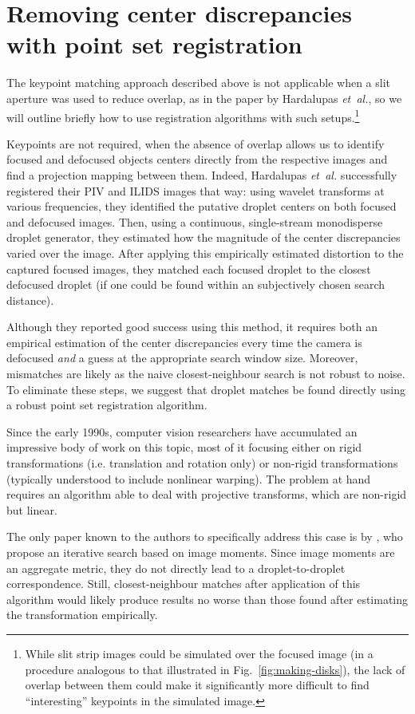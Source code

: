 \documentclass[11.5pt]{book}
\newcommand*{\figref}[1]{Fig.~\ref{#1}}
\begin{document}
\section{Removing center discrepancies with point set registration}
\label{sec:point-set-registration}
The keypoint matching approach described above is not applicable when a slit
aperture was used to reduce overlap, as in the paper by Hardalupas
\emph{et~al.}, so we will outline briefly how to use registration algorithms
with such setups.\footnote{While slit strip images could be
simulated over the focused image (in a procedure analogous to that illustrated
in \figref{fig:making-disks}), the lack of overlap between them could make it
significantly more difficult to find ``interesting'' keypoints in the simulated
image.}

Keypoints are not required, when the absence of overlap allows
us to identify focused and defocused objects centers directly from the respective
images and find a projection mapping between them. Indeed, Hardalupas
\emph{et~al.} successfully registered their PIV and ILIDS images that way: using
wavelet transforms at various frequencies, they identified the putative droplet
centers on both focused and defocused images.  Then, using a continuous,
single-stream monodisperse droplet generator, they estimated how the magnitude
of the center discrepancies varied over the image.  After applying this
empirically estimated distortion to the captured focused images, they matched each
focused droplet to the closest defocused droplet (if one could be found within an
subjectively chosen search distance).

Although they reported good success using this method, it requires both an
empirical estimation of the center discrepancies every time the camera is
defocused \emph{and} a guess at the appropriate search window size. Moreover,
mismatches are likely as the naive closest-neighbour search is not robust to
noise. To eliminate these steps, we suggest that droplet matches be found
directly using a robust point set registration algorithm.

Since the early 1990s, computer vision researchers have accumulated an
impressive body of work on this topic, most of it focusing either
on rigid transformations (i.e. translation and rotation only) or non-rigid
transformations (typically understood to include nonlinear warping). The problem
at hand requires an algorithm able to deal with projective transforms, which
are non-rigid but linear.

The only paper known to the authors to specifically address this case is by
\citet{Chi11}, who propose an iterative search based on image moments. Since
image moments are an aggregate metric, they do not directly lead to a
droplet-to-droplet correspondence. Still, closest-neighbour matches after
application of this algorithm would likely produce results no worse than those
found after estimating the transformation empirically.
\end{document}
